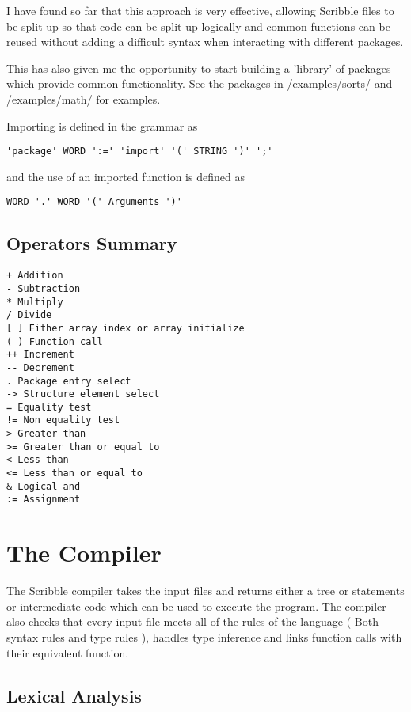 \documentclass[]{final_report}
\begin{document}
I have found so far that this approach is very effective, allowing Scribble files to be split up so that code can be split up logically and common functions can be reused without adding a difficult syntax when interacting with different packages.

This has also given me the opportunity to start building a 'library' of packages which provide common functionality. See the packages in /examples/sorts/ and /examples/math/ for examples.

Importing is defined in the grammar as 

\begin{verbatim}
'package' WORD ':=' 'import' '(' STRING ')' ';'
\end{verbatim}

and the use of an imported function is defined as

\begin{verbatim}
WORD '.' WORD '(' Arguments ')'
\end{verbatim}

\section{Operators Summary}

\begin {verbatim}
+ Addition
- Subtraction
* Multiply
/ Divide
[ ] Either array index or array initialize
( ) Function call
++ Increment
-- Decrement
. Package entry select
-> Structure element select
= Equality test
!= Non equality test
> Greater than
>= Greater than or equal to
< Less than
<= Less than or equal to
& Logical and 
:= Assignment
\end{verbatim}

\chapter{The Compiler}

The Scribble compiler takes the input files and returns either a tree or statements or intermediate code which can be used to execute the program. The compiler also checks that every input file meets all of the rules of the language ( Both syntax rules and type rules ), handles type inference and links function calls with their equivalent function.

\section{Lexical Analysis}
\end{document}
